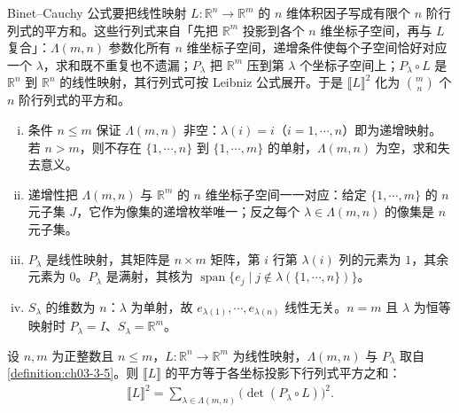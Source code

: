 \documentclass[../../main.tex]{subfiles}%
\begin{document}
\begin{remark}\label{remark:ch03-def-3-5-动机}
Binet--Cauchy 公式要把线性映射 $L:\mathbb{R}^n\to\mathbb{R}^m$ 的 $n$ 维体积因子写成有限个 $n$ 阶行列式的平方和。这些行列式来自「先把 $\mathbb{R}^m$ 投影到各个 $n$ 维坐标子空间，再与 $L$ 复合」：$\Lambda(m,n)$ 参数化所有 $n$ 维坐标子空间，递增条件使每个子空间恰好对应一个 $\lambda$，求和既不重复也不遗漏；$P_\lambda$ 把 $\mathbb{R}^m$ 压到第 $\lambda$ 个坐标子空间上；$P_\lambda\circ L$ 是 $\mathbb{R}^n$ 到 $\mathbb{R}^n$ 的线性映射，其行列式可按 Leibniz 公式展开。于是 $\llbracket L\rrbracket^2$ 化为 $\binom{m}{n}$ 个 $n$ 阶行列式的平方和。
\end{remark}

\begin{remark}\label{remark:ch03-def-3-5-条件}
\begin{enumerate}[(i)]
\item 条件 $n\leqslant m$ 保证 $\Lambda(m,n)$ 非空：$\lambda(i)=i$（$i=1,\cdots,n$）即为递增映射。若 $n>m$，则不存在 $\{1,\cdots,n\}$ 到 $\{1,\cdots,m\}$ 的单射，$\Lambda(m,n)$ 为空，求和失去意义。
\item 递增性把 $\Lambda(m,n)$ 与 $\mathbb{R}^m$ 的 $n$ 维坐标子空间一一对应：给定 $\{1,\cdots,m\}$ 的 $n$ 元子集 $J$，它作为像集的递增枚举唯一；反之每个 $\lambda\in\Lambda(m,n)$ 的像集是 $n$ 元子集。
\item $P_\lambda$ 是线性映射，其矩阵是 $n\times m$ 矩阵，第 $i$ 行第 $\lambda(i)$ 列的元素为 $1$，其余元素为 $0$。$P_\lambda$ 是满射，其核为 $\operatorname{span}\{e_j\mid j\notin\lambda(\{1,\cdots,n\})\}$。
\item $S_\lambda$ 的维数为 $n$：$\lambda$ 为单射，故 $e_{\lambda(1)},\cdots,e_{\lambda(n)}$ 线性无关。$n=m$ 且 $\lambda$ 为恒等映射时 $P_\lambda=I$、$S_\lambda=\mathbb{R}^m$。
\end{enumerate}
\end{remark}

\begin{theorem}\label{theorem:ch03-3-7}
设 $n,m$ 为正整数且 $n\leqslant m$，$L:\mathbb{R}^n\to\mathbb{R}^m$ 为线性映射，$\Lambda(m,n)$ 与 $P_\lambda$ 取自\cref{definition:ch03-3-5}。则 $\llbracket L\rrbracket$ 的平方等于各坐标投影下行列式平方之和：%
\begin{align*}
\llbracket L\rrbracket^2=\sum_{\lambda\in\Lambda(m,n)}\bigl(\det(P_\lambda\circ L)\bigr)^2.
\end{align*}
\end{theorem}
\end{document}
